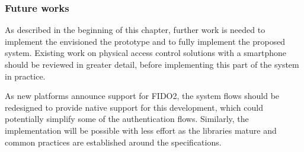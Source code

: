 \subsubsection*{Future works}
As described in the beginning of this chapter, further work is needed to implement the envisioned the prototype and to fully implement the proposed system. Existing work on physical access control solutions with a smartphone should be reviewed in greater detail, before implementing this part of the system in practice. 

As new platforms announce support for FIDO2, the system flows should be redesigned to provide native support for this development, which could potentially simplify some of the authentication flows. Similarly, the implementation will be possible with less effort as the libraries mature and common practices are established around the specifications.